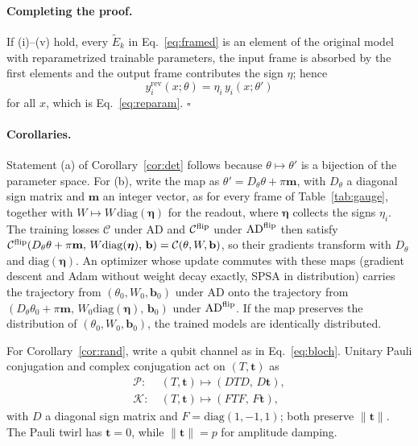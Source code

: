 \documentclass[
 aps,pra,
 twocolumn,
 superscriptaddress,
 longbibliography,
 nofootinbib
]{revtex4-2}
\newcommand{\AD}{\mathrm{AD}}
\begin{document}
\paragraph{Completing the proof.}
If (i)--(v) hold, every $\tilde E_k$ in Eq.~\eqref{eq:framed} is an element of the original
model with reparametrized trainable parameters, the input frame is absorbed by the first
elements and the output frame contributes the sign $\eta$; hence
\begin{equation}
y^{\mathrm{rev}}_i(x;\theta)=\eta_i\,y_i(x;\theta')
\end{equation}
for all $x$, which is Eq.~\eqref{eq:reparam}. \hfill$\square$

\paragraph{Corollaries.}
Statement (a) of Corollary~\ref{cor:det} follows because $\theta\mapsto\theta'$ is a
bijection of the parameter space. For (b), write the map as
$\theta'=D_\theta\theta+\pi\mathbf m$, with $D_\theta$ a diagonal sign matrix and
$\mathbf m$ an integer vector, as for every frame of Table~\ref{tab:gauge},
together with $W\mapsto W\,\mathrm{diag}(\boldsymbol\eta)$ for the readout, where
$\boldsymbol\eta$ collects the signs $\eta_i$. The training losses $\mathcal C$
under $\AD$ and $\mathcal C^{\rm flip}$ under $\AD^{\rm flip}$ then satisfy
$\mathcal C^{\rm flip}(D_\theta\theta+\pi\mathbf m,\,W\mathrm{diag}(\boldsymbol\eta),\,\mathbf b)=\mathcal C(\theta,W,\mathbf b)$,
so their gradients transform with $D_\theta$ and $\mathrm{diag}(\boldsymbol\eta)$.
An optimizer whose update commutes with these maps (gradient descent and Adam
without weight decay exactly, SPSA in distribution) carries the trajectory from
$(\theta_0,W_0,\mathbf b_0)$ under $\AD$ onto the trajectory from
$(D_\theta\theta_0+\pi\mathbf m,\,W_0\mathrm{diag}(\boldsymbol\eta),\,\mathbf b_0)$
under $\AD^{\rm flip}$. If the map preserves the distribution of
$(\theta_0,W_0,\mathbf b_0)$, the trained models are identically distributed.

For Corollary~\ref{cor:rand}, write a qubit channel as in Eq.~\eqref{eq:bloch}.
Unitary Pauli conjugation and complex conjugation act on $(T,\mathbf t)$ as
\begin{align}
\mathcal P\colon&\ (T,\mathbf t)\mapsto(DTD,\,D\mathbf t),
\label{eq:app_D}\\
\mathcal K\colon&\ (T,\mathbf t)\mapsto(FTF,\,F\mathbf t),
\label{eq:app_F}
\end{align}
with $D$ a diagonal sign matrix and $F=\mathrm{diag}(1,-1,1)$; both preserve
$\lVert\mathbf t\rVert$. The Pauli twirl has $\mathbf t=0$, while
$\lVert\mathbf t\rVert=p$ for amplitude damping.
\end{document}
